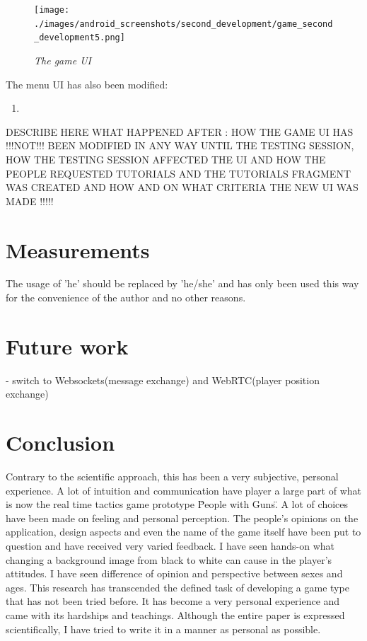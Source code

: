 \documentclass{article}
\begin{document}
\begin{figure}
\texttt{[image: ./images/android\_screenshots/second\_development/game\_second\_development5.png]}
\caption{\small \sl The game UI \label{fig:game_ui2}}
\end{figure}

The menu UI has also been modified:
\begin{enumerate}
  \item 
\end{enumerate}


DESCRIBE HERE WHAT HAPPENED AFTER : HOW THE GAME UI HAS !!!NOT!!! BEEN MODIFIED
IN ANY WAY UNTIL THE TESTING SESSION, HOW THE TESTING SESSION AFFECTED THE UI
AND HOW THE PEOPLE REQUESTED TUTORIALS AND THE TUTORIALS FRAGMENT WAS CREATED
AND HOW AND ON WHAT CRITERIA THE NEW UI WAS MADE !!!!!









\section{Measurements}


The usage of 'he' should be replaced by 'he/she' and has only been used this way
for the convenience of the author and no other reasons.




\section{Future work}

- switch to Websockets(message exchange) and WebRTC(player position exchange)



\section{Conclusion}

Contrary to the scientific approach, this has been a very subjective, personal
experience. A lot of intuition and communication have player a large part of
what is now the real time tactics game prototype \"People with Guns\". A lot of
choices have been made on feeling and personal perception. The people's opinions
on the application, design aspects and even the name of the game itself have
been put to question and have received very varied feedback. I have seen
hands-on what changing a background image from black to white can cause in the
player's attitudes. I have seen difference of opinion and perspective between
sexes and ages. This research has transcended the defined task of developing a
game type that has not been tried before. It has become a very personal
experience and came with its hardships and teachings. Although the entire paper
is expressed scientifically, I have tried to write it in a manner as personal as
possible.\newline
\end{document}
